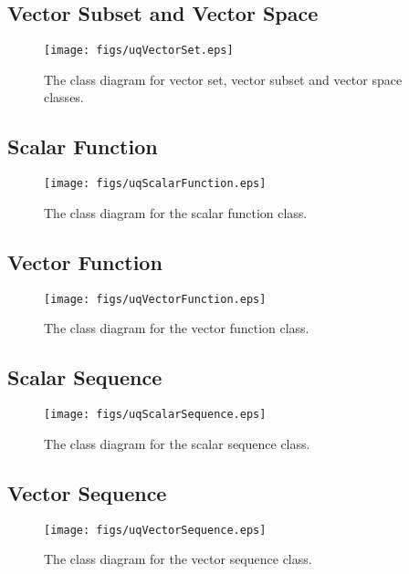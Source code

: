 \clearpage
\subsection{Vector Subset and Vector Space}

\begin{figure}[h!]
\centerline{
\texttt{[image: figs/uqVectorSet.eps]}
}
\caption{
The class diagram for vector set, vector subset and vector space classes.
}
\label{fig-vector-space-subset-classes}
\end{figure}

\clearpage
\subsection{Scalar Function}

\begin{figure}[h!]
\centerline{
\texttt{[image: figs/uqScalarFunction.eps]}
}
\caption{
The class diagram for the scalar function class.
}
\label{fig-scalar-function-class}
\end{figure}

\clearpage
\subsection{Vector Function}

\begin{figure}[h!]
\centerline{
\texttt{[image: figs/uqVectorFunction.eps]}
}
\caption{
The class diagram for the vector function class.
}
\label{fig-vector-function-class}
\end{figure}

\clearpage
\subsection{Scalar Sequence}

\begin{figure}[h!]
\centerline{
\texttt{[image: figs/uqScalarSequence.eps]}
}
\caption{
The class diagram for the scalar sequence class.
}
\label{fig-scalar-sequence-class}
\end{figure}

\clearpage
\subsection{Vector Sequence}

\begin{figure}[h!]
\centerline{
\texttt{[image: figs/uqVectorSequence.eps]}
}
\caption{
The class diagram for the vector sequence class.
}
\label{fig-vector-sequence-class}
\end{figure}


